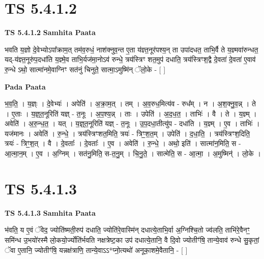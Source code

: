 \documentclass[17pt]{extarticle}
\begin{document}
\section*{ TS 5.4.1.2 }

\textbf{TS 5.4.1.2 } \newline
\textbf{Samhita Paata} \newline

भवति य॒ज्ञो दे॒वेभ्योऽपा᳚क्राम॒त् तम॑व॒रुधं॒ नाश॑क्नुव॒न्त ए॒ता य॑ज्ञ्त॒नूर॑पश्य॒न् ता उपा॑दधत॒ ताभि॒र्वै ते य॒ज्ञ्मवा॑रुन्धत॒ यद्-य॑ज्ञ्त॒नूरु॑प॒दधा॑ति य॒ज्ञ्मे॒व ताभि॒र्यज॑मा॒नोऽव॑ रुन्धे॒ त्रय॑स्त्रिꣳ शत॒मुप॑ दधाति॒ त्रय॑स्त्रिꣳश॒द्वै दे॒वता॑ दे॒वता॑ ए॒वाव॑ रु॒न्धे ऽथो॒ सात्मा॑नमे॒वाग्निꣳ सत॑नुं चिनुते॒ सात्मा॒ऽमुष्मि॑न् ॅलो॒के - [  ] \newline

\textbf{Pada Paata} \newline

भ॒व॒ति॒ । य॒ज्ञ्ः । दे॒वेभ्यः॑ । अपेति॑ । अ॒क्रा॒म॒त् । तम् । अ॒व॒रुध॒मित्य॑व - रुध᳚म् । न । अ॒श॒क्नु॒व॒न्न् । ते । ए॒ताः । य॒ज्ञ्॒त॒नूरिति॑ यज्ञ् - त॒नूः । अ॒प॒श्य॒न्न् । ताः । उपेति॑ । अ॒द॒ध॒त॒ । ताभिः॑ । वै । ते । य॒ज्ञ्म् । अवेति॑ । अ॒रु॒न्ध॒त॒ । यत् । य॒ज्ञ्॒त॒नूरिति॑ यज्ञ् - त॒नूः । उ॒प॒दधा॒तीत्यु॑प - दधा॑ति । य॒ज्ञ्म् । ए॒व । ताभिः॑ । यज॑मानः । अवेति॑ । रु॒न्धे॒ । त्रय॑स्त्रिꣳशत॒मिति॒ त्रयः॑ - त्रिꣳ॒॒श॒त॒म् । उपेति॑ । द॒धा॒ति॒ । त्रय॑स्त्रिꣳश॒दिति॒ त्रयः॑ - त्रिꣳ॒॒श॒त् । वै । दे॒वताः᳚ । दे॒वताः᳚ । ए॒व । अवेति॑ । रु॒न्धे॒ । अथो॒ इति॑ । सात्मा॑न॒मिति॒ स - आ॒त्मा॒न॒म् । ए॒व । अ॒ग्निम् । सत॑नु॒मिति॒ स-त॒नु॒म् । चि॒नु॒ते॒ । सात्मेति॒ स - आ॒त्मा॒ । अ॒मुष्मिन्॑ । लो॒के ।  \newline




\section*{ TS 5.4.1.3 }

\textbf{TS 5.4.1.3 } \newline
\textbf{Samhita Paata} \newline

भ॑वति॒ य ए॒वं ॅवेद॒ ज्योति॑ष्मती॒रुप॑ दधाति॒ ज्योति॑रे॒वास्मि॑न् दधात्ये॒ताभि॒र्वा अ॒ग्निश्चि॒तो ज्व॑लति॒ ताभि॑रे॒वैनꣳ॒॒ समि॑न्ध उ॒भयो॑रस्मै लो॒कयो॒र्ज्योति॑र्भवति नक्षत्रेष्ट॒का उप॑ दधात्ये॒तानि॒ वै दि॒वो ज्योतीꣳ॑षि॒ तान्ये॒वाव॑ रुन्धे सु॒कृतां॒ ॅवा ए॒तानि॒ ज्योतीꣳ॑षि॒ यन्नक्ष॑त्राणि॒ तान्ये॒वाऽऽ*प्नो॒त्यथो॑ अनूका॒शमे॒वैतानि॒ - [  ] \newline
\end{document}
